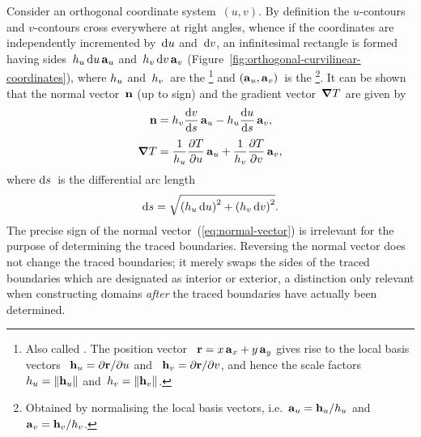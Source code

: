 \begin{figure}
\end{figure}

Consider an orthogonal coordinate system~$(u, v)$.
By definition the $u$-contours and $v$-contours
cross everywhere at right angles,
whence if the coordinates are independently incremented
by~$\mathop{}\!\mathrm{d} u$ and~$\mathop{}\!\mathrm{d} v$,
an infinitesimal rectangle is formed
having sides~$\scalefac[u] \td u \basisvec{u}$
and~$\scalefac[v] \td v \basisvec{v}$
(Figure~\ref{fig:orthogonal-curvilinear-coordinates}),
where $\scalefac[u]$ and~$\scalefac[v]$~are the %
\footnote{
  Also called .
  The position vector~%
    $\boldsymbol{\mathbf{r}} = x \mathop{}\!\boldsymbol{\mathbf{a}}_{x} + y \mathop{}\!\boldsymbol{\mathbf{a}}_{y}$
  gives rise to the local basis vectors~%
    $\mathop{}\!\boldsymbol{\mathbf{h}}_{u} = \mathop{}\!\partial\boldsymbol{\mathbf{r}} / {\mathop{}\!\partial u}$
  and~%
    $\mathop{}\!\boldsymbol{\mathbf{h}}_{v} = \mathop{}\!\partial\boldsymbol{\mathbf{r}} / {\mathop{}\!\partial v}$,
  and hence the scale factors~$\scalefac[u] = \norm{\localvec{u}}$
  and~$\scalefac[v] = \norm{\localvec{v}}$.
}
and $(\mathop{}\!\boldsymbol{\mathbf{a}}_{u}, \mathop{}\!\boldsymbol{\mathbf{a}}_{v})$~is the %
\footnote{
  Obtained by normalising the local basis vectors,
  i.e.~$\basisvec{u} = \localvec{u} / \scalefac[u]$
  and~$\basisvec{v} = \localvec{v} / \scalefac[v]$.
}.
It can be shown that the normal vector~$\mathop{}\!\boldsymbol{\mathbf{n}}$ (up to sign)
and the gradient vector~$\mathop{}\!\boldsymbol{\mathbf{\nabla}} T$ are given by
\begin{align}
  \normalvec &=
    \scalefac[v] \tder{v}{s} \basisvec{u}
      -
    \scalefac[u] \tder{u}{s} \basisvec{v},
    \label{eq:normal-vector}
    \\[\tallspace]
  \del T &=
    \frac{1}{\scalefac[u]} \pder{T}{u} \basisvec{u}
      +
    \frac{1}{\scalefac[v]} \pder{T}{v} \basisvec{v},
    \label{eq:gradient}
\end{align}
where $\mathop{}\!\mathrm{d} s$~is the differential arc length
\begin{equation}
  \td s =
  \sqrt{
    \roundbr[\bulkysize]{\scalefac[u] \td u}^2
      +
    \roundbr[\bulkysize]{\scalefac[v] \td v}^2
  }.
  \label{eq:differential-arc-length}
\end{equation}
The precise sign of the normal vector~(\ref{eq:normal-vector}) is irrelevant
for the purpose of determining the traced boundaries.
Reversing the normal vector does not change the traced boundaries;
it merely swaps the sides of the traced boundaries
which are designated as interior or exterior,
a distinction only relevant when constructing domains
\emph{after} the traced boundaries have actually been determined.

